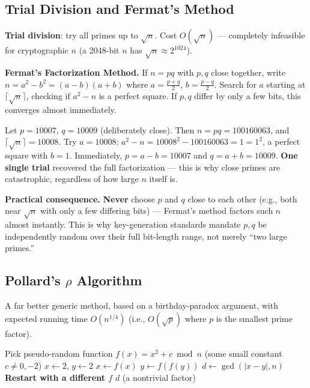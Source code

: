 \subsection{Trial Division and Fermat's Method}

\textbf{Trial division}: try all primes up to $\sqrt{n}$. Cost $O(\sqrt{n})$ — completely infeasible for cryptographic $n$ (a 2048-bit $n$ has $\sqrt{n} \approx 2^{1024}$).

\medskip\noindent\textbf{Fermat's Factorization Method.} If $n = pq$ with $p,q$ close together, write $n = a^2 - b^2 = (a-b)(a+b)$ where $a = \frac{p+q}{2}$, $b = \frac{p-q}{2}$. Search for $a$ starting at $\lceil\sqrt{n}\rceil$, checking if $a^2 - n$ is a perfect square. If $p, q$ differ by only a few bits, this converges almost immediately.

\begin{example}
Let $p = 10007$, $q = 10009$ (deliberately close). Then $n = pq = 100160063$, and $\lceil\sqrt{n}\rceil = 10008$. Try $a = 10008$: $a^2 - n = 10008^2 - 100160063 = 1 = 1^2$, a perfect square with $b=1$. Immediately, $p = a - b = 10007$ and $q = a+b = 10009$. \textbf{One single trial} recovered the full factorization — this is why close primes are catastrophic, regardless of how large $n$ itself is.
\end{example}

\medskip\noindent\textbf{Practical consequence.} \textbf{Never} choose $p$ and $q$ close to each other (e.g., both near $\sqrt{n}$ with only a few differing bits) — Fermat's method factors such $n$ almost instantly. This is why key-generation standards mandate $p, q$ be independently random over their full bit-length range, not merely ``two large primes.''

\subsection{Pollard's $\rho$ Algorithm}

A far better generic method, based on a birthday-paradox argument, with expected running time $O(n^{1/4})$ (i.e., $O(\sqrt{p})$ where $p$ is the smallest prime factor).

\begin{algorithm}[h]
\caption{Pollard's $\rho$ (Floyd cycle-detection variant)}
\begin{algorithmic}[1]
\State Pick pseudo-random function $f(x) = x^2 + c \bmod n$ (some small constant $c \ne 0, -2$)
\State $x \gets 2$, $y \gets 2$
\Repeat
    \State $x \gets f(x)$
    \State $y \gets f(f(y))$
    \State $d \gets \gcd(|x - y|, n)$
 \State \textbf{Restart with a different $f$} \Else \State \Return $d$ (a nontrivial factor) \EndIf
\end{algorithmic}
\end{algorithm}


